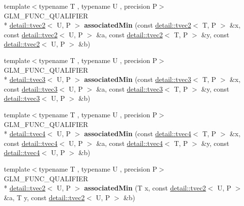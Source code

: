 \begin{DoxyCompactItemize}
\item 
\hypertarget{namespaceglm_a6f7aa32f2c2628328b04cb06972161ef}{{\footnotesize template$<$typename T , typename U , precision P$>$ }\\G\-L\-M\-\_\-\-F\-U\-N\-C\-\_\-\-Q\-U\-A\-L\-I\-F\-I\-E\-R \\*
\hyperlink{structglm_1_1detail_1_1tvec2}{detail\-::tvec2}$<$ U, P $>$ {\bfseries associated\-Min} (const \hyperlink{structglm_1_1detail_1_1tvec2}{detail\-::tvec2}$<$ T, P $>$ \&x, const \hyperlink{structglm_1_1detail_1_1tvec2}{detail\-::tvec2}$<$ U, P $>$ \&a, const \hyperlink{structglm_1_1detail_1_1tvec2}{detail\-::tvec2}$<$ T, P $>$ \&y, const \hyperlink{structglm_1_1detail_1_1tvec2}{detail\-::tvec2}$<$ U, P $>$ \&b)}\label{namespaceglm_a6f7aa32f2c2628328b04cb06972161ef}

\item 
\hypertarget{namespaceglm_a72be26bfaf248286d35e8c409432dc7b}{{\footnotesize template$<$typename T , typename U , precision P$>$ }\\G\-L\-M\-\_\-\-F\-U\-N\-C\-\_\-\-Q\-U\-A\-L\-I\-F\-I\-E\-R \\*
\hyperlink{structglm_1_1detail_1_1tvec3}{detail\-::tvec3}$<$ U, P $>$ {\bfseries associated\-Min} (const \hyperlink{structglm_1_1detail_1_1tvec3}{detail\-::tvec3}$<$ T, P $>$ \&x, const \hyperlink{structglm_1_1detail_1_1tvec3}{detail\-::tvec3}$<$ U, P $>$ \&a, const \hyperlink{structglm_1_1detail_1_1tvec3}{detail\-::tvec3}$<$ T, P $>$ \&y, const \hyperlink{structglm_1_1detail_1_1tvec3}{detail\-::tvec3}$<$ U, P $>$ \&b)}\label{namespaceglm_a72be26bfaf248286d35e8c409432dc7b}

\item 
\hypertarget{namespaceglm_a320da0e398dd2c7675b8be6755abbcd2}{{\footnotesize template$<$typename T , typename U , precision P$>$ }\\G\-L\-M\-\_\-\-F\-U\-N\-C\-\_\-\-Q\-U\-A\-L\-I\-F\-I\-E\-R \\*
\hyperlink{structglm_1_1detail_1_1tvec4}{detail\-::tvec4}$<$ U, P $>$ {\bfseries associated\-Min} (const \hyperlink{structglm_1_1detail_1_1tvec4}{detail\-::tvec4}$<$ T, P $>$ \&x, const \hyperlink{structglm_1_1detail_1_1tvec4}{detail\-::tvec4}$<$ U, P $>$ \&a, const \hyperlink{structglm_1_1detail_1_1tvec4}{detail\-::tvec4}$<$ T, P $>$ \&y, const \hyperlink{structglm_1_1detail_1_1tvec4}{detail\-::tvec4}$<$ U, P $>$ \&b)}\label{namespaceglm_a320da0e398dd2c7675b8be6755abbcd2}

\item 
\hypertarget{namespaceglm_a1e99d87b527fe65cc8d972a2284d3f95}{{\footnotesize template$<$typename T , typename U , precision P$>$ }\\G\-L\-M\-\_\-\-F\-U\-N\-C\-\_\-\-Q\-U\-A\-L\-I\-F\-I\-E\-R \\*
\hyperlink{structglm_1_1detail_1_1tvec2}{detail\-::tvec2}$<$ U, P $>$ {\bfseries associated\-Min} (T x, const \hyperlink{structglm_1_1detail_1_1tvec2}{detail\-::tvec2}$<$ U, P $>$ \&a, T y, const \hyperlink{structglm_1_1detail_1_1tvec2}{detail\-::tvec2}$<$ U, P $>$ \&b)}\label{namespaceglm_a1e99d87b527fe65cc8d972a2284d3f95}


\end{DoxyCompactItemize}
